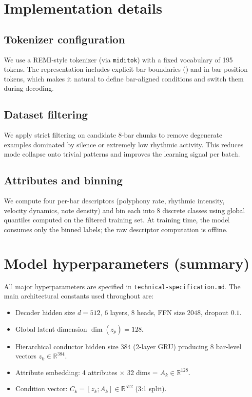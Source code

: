 
\section{Implementation details}
\subsection{Tokenizer configuration}
We use a REMI-style tokenizer (via \texttt{miditok}) with a fixed vocabulary of 195 tokens. The representation includes explicit bar boundaries (\Bar) and in-bar position tokens, which makes it natural to define bar-aligned conditions and switch them during decoding.

\subsection{Dataset filtering}
We apply strict filtering on candidate 8-bar chunks to remove degenerate examples dominated by silence or extremely low rhythmic activity. This reduces mode collapse onto trivial patterns and improves the learning signal per batch.

\subsection{Attributes and binning}
We compute four per-bar descriptors (polyphony rate, rhythmic intensity, velocity dynamics, note density) and bin each into 8 discrete classes using global quantiles computed on the filtered training set. At training time, the model consumes only the binned labels; the raw descriptor computation is offline.

\section{Model hyperparameters (summary)}
All major hyperparameters are specified in \texttt{technical-specification.md}. The main architectural constants used throughout are:
\begin{itemize}[leftmargin=*,itemsep=0pt]
  \item Decoder hidden size $d=512$, $6$ layers, $8$ heads, FFN size $2048$, dropout $0.1$.
  \item Global latent dimension $\dim(z_p)=128$.
  \item Hierarchical conductor hidden size $384$ (2-layer GRU) producing 8 bar-level vectors $z_k\in\mathbb{R}^{384}$.
  \item Attribute embedding: 4 attributes $\times$ 32 dims = $A_k\in\mathbb{R}^{128}$.
  \item Condition vector: $C_k=[z_k;A_k]\in\mathbb{R}^{512}$ (3:1 split).
\end{itemize}

